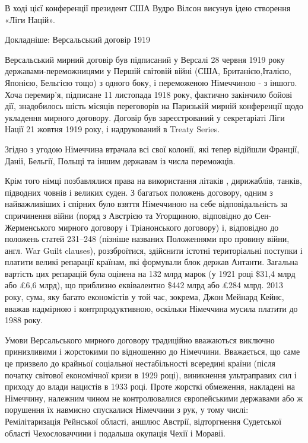 \begin{itemize}
\begin{itemize}
\begin{multicols}{2}
В ході цієї конференції президент США Вудро Вілсон висунув ідею створення «Ліги
Націй».


Докладніше: Версальський договір 1919

Версальський мирний договір був підписаний у Версалі 28 червня 1919 року
державами-переможницями у Першій світовій війні (США, Британією,Італією,
Японією, Бельгією тощо) з одного боку, і переможеною Німеччиною - з іншого.
Хоча перемир'я, підписане 11 листопада 1918 року, фактично закінчило бойові
дії, знадобилось шість місяців переговорів на Паризькій мирній конференції щодо
укладення мирного договору. Договір був зареєстрований у секретаріаті Ліги
Нації 21 жовтня 1919 року, і надрукований в Treaty Series.

Згідно з угодою Німеччина втрачала всі свої колонії, які тепер відійшли
Франції, Данії, Бельгії, Польщі та іншим державам із числа переможців.

Крім того німці позбавлялися права на використання літаків , дирижаблів,
танків, підводних човнів і великих суден. З багатьох положень договору, одним з
найважливіших і спірних було взяття Німеччиною на себе відповідальність за
спричинення війни (поряд з Австрією та Угорщиною, відповідно до
Сен-Жерменського мирного договору і Тріанонського договору) і, відповідно до
положень статей 231–248 (пізніше названих Положеннями про провину війни, англ.
War Guilt clauses), роззброїтися, здійснити істотні територіальні поступки і
платити великі репарації країнам, які формували блок держав Антанти. Загальна
вартість цих репарацій була оцінена на 132 млрд марок (у 1921 році \$31,4 млрд
або £6,6 млрд), що приблизно еквівалентно \$442 млрд або £284 млрд. 2013 року,
сума, яку багато економістів у той час, зокрема, Джон Мейнард Кейнс, вважав
надмірною і контрпродуктивною, оскільки Німеччина мусила платити до 1988 року.


Умови Версальського мирного договору традиційно вважаються виключно
принизливими і жорстокими по відношенню до Німеччини. Вважається, що саме це
призвело до крайньої соціальної нестабільності всередині країни (після початку
світової економічної кризи в 1929 році), виникнення ультраправих сил і приходу
до влади нацистів в 1933 році. Проте жорсткі обмеження, накладені на Німеччину,
належним чином не контролювалися європейськими державами або ж порушення їх
навмисно спускалися Німеччини з рук, у тому числі: Ремілітаризація Рейнської
області, аншлюс Австрії, відторгнення Судетської області Чехословаччини і
подальша окупація Чехії і Моравії.


\end{multicols}
\end{itemize}
\end{itemize}
